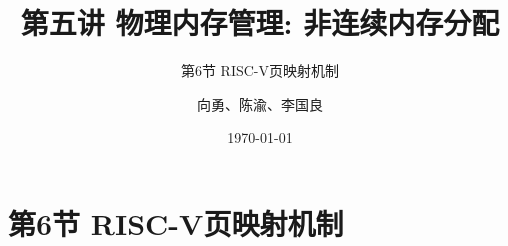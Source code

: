 


\title[第5讲]{第五讲 物理内存管理: 非连续内存分配} %
\subtitle{第6节 RISC-V页映射机制}
\author{向勇、陈渝、李国良} %
\date{\today} %



\begin{frame}
\titlepage %
\end{frame}


\section{第6节 RISC-V页映射机制}%


